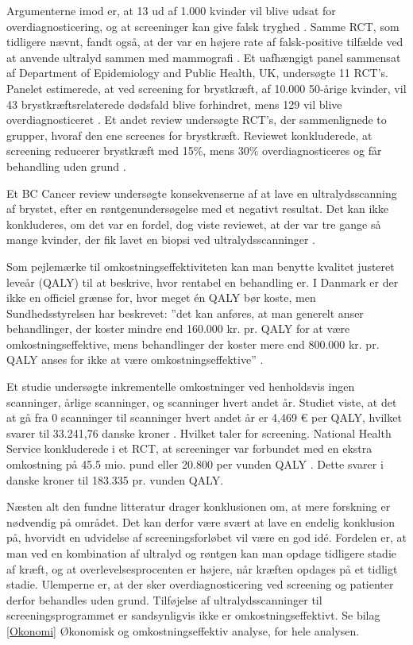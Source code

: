 Argumenterne imod er, at 13 ud af 1.000 kvinder vil blive udsat for overdiagnosticering, og at screeninger kan give falsk tryghed \cite{Argumenter}. Samme RCT, som tidligere nævnt, fandt også, at der var en højere rate af falsk-positive tilfælde ved at anvende ultralyd sammen med mammografi \cite{Japan}. Et uafhængigt panel sammensat af Department of Epidemiology and Public Health, UK, undersøgte 11 RCT’s. Panelet estimerede, at ved screening for brystkræft, af 10.000 50-årige kvinder, vil 43 brystkræftsrelaterede dødsfald blive forhindret, mens 129 vil blive overdiagnosticeret \cite{Panel}. Et andet review undersøgte RCT’s, der sammenlignede to grupper, hvoraf den ene screenes for brystkræft. Reviewet konkluderede, at screening reducerer brystkræft med 15\%, mens 30\% overdiagnosticeres og får behandling uden grund \cite{Gotzche}. 

Et BC Cancer review undersøgte konsekvenserne af at lave en ultralydsscanning af brystet, efter en røntgenundersøgelse med et negativt resultat. Det kan ikke konkluderes, om det var en fordel, dog viste reviewet, at der var tre gange så mange kvinder, der fik lavet en biopsi ved ultralydsscanninger \cite{DenseBreast}.

Som pejlemærke til omkostningseffektiviteten kan man benytte kvalitet justeret leveår (QALY) til at beskrive, hvor rentabel en behandling er. I Danmark er der ikke en officiel grænse for, hvor meget én QALY bør koste, men Sundhedsstyrelsen har beskrevet: ”det kan anføres, at man generelt anser behandlinger, der koster mindre end 160.000 kr. pr. QALY for at være omkostningseffektive, mens behandlinger der koster mere end 800.000 kr. pr. QALY anses for ikke at være omkostningseffektive” \cite{QALY}. 

Et studie undersøgte inkrementelle omkostninger ved henholdsvis ingen scanninger, årlige scanninger, og scanninger hvert andet år. Studiet viste, at det at gå fra 0 scanninger til scanninger hvert andet år er 4,469 € per QALY, hvilket svarer til 33.241,76 danske kroner \cite{SpanskStudie}. Hvilket taler for screening. National Health Service konkluderede i et RCT, at screeninger var forbundet med en ekstra omkostning på 45.5 mio. pund eller 20.800 per vunden QALY \cite{NHS}. Dette svarer i danske kroner til 183.335 pr. vunden QALY.  

Næsten alt den fundne litteratur drager konklusionen om, at mere forskning er nødvendig på området. Det kan derfor være svært at lave en endelig konklusion på, hvorvidt en udvidelse af screeningsforløbet vil være en god idé. Fordelen er, at man ved en kombination af ultralyd og røntgen kan man opdage tidligere stadie af kræft, og at overlevelsesprocenten er højere, når kræften opdages på et tidligt stadie. Ulemperne er, at der sker overdiagnosticering ved screening og patienter derfor behandles uden grund. Tilføjelse af ultralydsscanninger til screeningsprogrammet er sandsynligvis ikke er omkostningseffektivt. Se bilag \ref{Okonomi} Økonomisk og omkostningseffektiv analyse, for hele analysen. 
